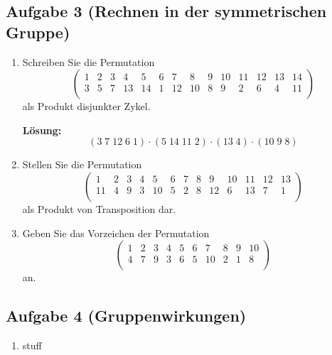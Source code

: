 \documentclass[11pt,a4paper,ngerman]{article}
\begin{document}
\subsection*{Aufgabe 3 \mdseries (Rechnen in der symmetrischen Gruppe)}

\begin{enumerate}[\bfseries a)]
\item Schreiben Sie die Permutation
$$
\left( \begin{array}{cccccccccccccc}
1 & 2 & 3 & 4 & 5 & 6 & 7 & 8 & 9 & 10 & 11 & 12 & 13 & 14  \\
3 & 5 & 7 & 13 & 14 & 1 & 12 & 10 & 8 & 9 & 2 & 6 & 4 & 11  \\
\end{array} \right)
$$
als Produkt disjunkter Zykel.

\textbf{Lösung:}\\
$$
(3 \; 7 \; 12 \; 6  \;1) \cdot (5 \;14 \;11\; 2) \cdot (13 \;4) \cdot (10\; 9\; 8)
$$


\item Stellen Sie die Permutation
$$
\left( \begin{array}{cccccccccccccc}
1 & 2 & 3 & 4 & 5 & 6 & 7 & 8 & 9 & 10 & 11 & 12 & 13  \\
11 & 4 & 9 & 3 & 10 & 5 & 2 & 8 & 12 & 6 & 13 & 7 & 1  \\
\end{array} \right)
$$
als Produkt von Transposition dar.\\



\item Geben Sie das Vorzeichen der Permutation 
$$
\left( \begin{array}{cccccccccccccc}
1 & 2 & 3 & 4 & 5 & 6 & 7 & 8 & 9 & 10  \\
4 & 7 & 9 & 3 & 6 & 5 & 10 & 2 & 1 & 8  \\
\end{array} \right)
$$
an.

\end{enumerate}

\subsection*{Aufgabe 4 \mdseries (Gruppenwirkungen)}

\begin{enumerate}[\bfseries a)]
\item stuff
\end{enumerate}

\label{LastPage}
\end{document}
